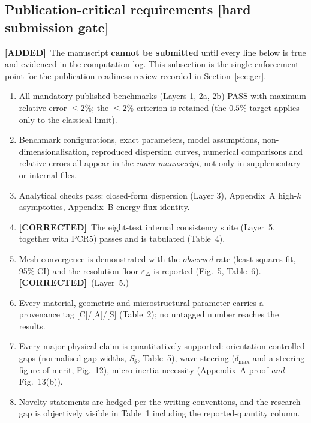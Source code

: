 \documentclass[11pt,a4paper]{article}
\newcommand{\bp}[1]{\textcolor{accent}{\textsf{\footnotesize [#1]}}}
\newcommand{\ADDED}{{\color{addcol}\textbf{[ADDED]}}}
\newcommand{\COR}{{\color{corcol}\textbf{[CORRECTED]}}}
\begin{document}
\subsection{Publication-critical requirements \bp{hard submission gate}}
\label{sec:pcr}

\ADDED\ The manuscript \textbf{cannot be submitted} until every line below is true and
evidenced in the computation log. This subsection is the single enforcement point for
the publication-readiness review recorded in Section~\ref{sec:gcr}.

\begin{enumerate}[label=\textbf{PCR\arabic*.}]
\item All mandatory published benchmarks (Layers 1, 2a, 2b) PASS with maximum relative
error $\le2\%$; the $\le2\%$ criterion is retained (the $0.5\%$ target applies only to the
classical limit).
\item Benchmark configurations, exact parameters, model assumptions, non-dimensionalisation,
reproduced dispersion curves, numerical comparisons and relative errors all appear in the
\emph{main manuscript}, not only in supplementary or internal files.
\item Analytical checks pass: closed-form dispersion (Layer 3), Appendix~A high-$k$
asymptotics, Appendix~B energy-flux identity.
\item \COR\ The eight-test internal consistency suite (Layer~5, together with PCR5) passes and is tabulated (Table~4).
\item Mesh convergence is demonstrated with the \emph{observed} rate (least-squares fit,
95\% CI) and the resolution floor $\varepsilon_\Delta$ is reported (Fig.~5, Table~6). \COR\ (Layer~5.)
\item Every material, geometric and microstructural parameter carries a provenance tag
[C]/[A]/[S] (Table~2); no untagged number reaches the results.
\item Every major physical claim is quantitatively supported: orientation-controlled gaps
(normalised gap widths, $S_\theta$, Table~5), wave steering ($\delta_{\max}$ and a steering
figure-of-merit, Fig.~12), micro-inertia necessity (Appendix~A proof \emph{and} Fig.~13(b)).
\item Novelty statements are hedged per the writing conventions, and the research gap is
objectively visible in Table~1 including the reported-quantity column.
\end{enumerate}
\end{document}
